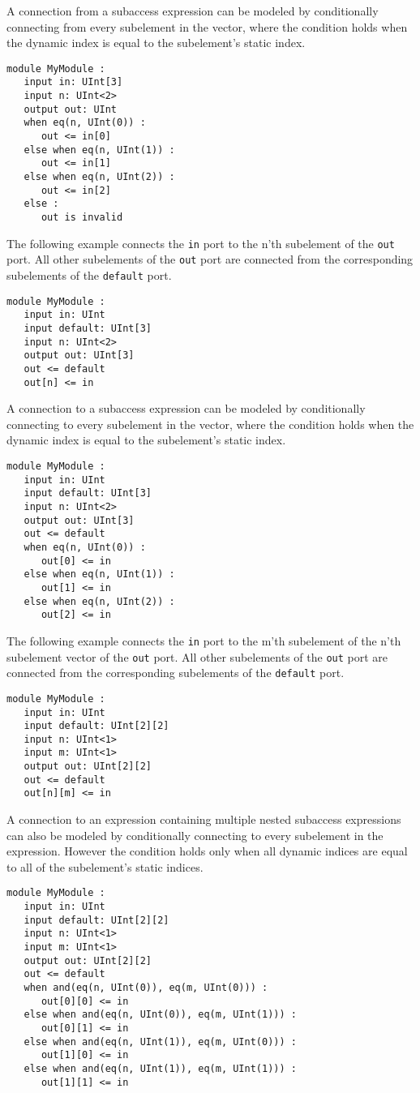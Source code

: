 \documentclass[12pt]{article}
\begin{document}
A connection from a subaccess expression can be modeled by conditionally connecting from every subelement in the vector, where the condition holds when the dynamic index is equal to the subelement's static index.
\begin{verbatim}
module MyModule :
   input in: UInt[3]
   input n: UInt<2>
   output out: UInt
   when eq(n, UInt(0)) :
      out <= in[0]
   else when eq(n, UInt(1)) :
      out <= in[1]
   else when eq(n, UInt(2)) :
      out <= in[2]            
   else :
      out is invalid
\end{verbatim}

The following example connects the \verb|in| port to the n'th subelement of the \verb|out| port. All other subelements of the \verb|out| port are connected from the corresponding subelements of the \verb|default| port.
\begin{verbatim}
module MyModule :
   input in: UInt
   input default: UInt[3]
   input n: UInt<2>
   output out: UInt[3]
   out <= default
   out[n] <= in
\end{verbatim}

A connection to a subaccess expression can be modeled by conditionally connecting to every subelement in the vector, where the condition holds when the dynamic index is equal to the subelement's static index.
\begin{verbatim}
module MyModule :
   input in: UInt
   input default: UInt[3]
   input n: UInt<2>
   output out: UInt[3]   
   out <= default
   when eq(n, UInt(0)) :
      out[0] <= in
   else when eq(n, UInt(1)) :
      out[1] <= in
   else when eq(n, UInt(2)) :
      out[2] <= in
\end{verbatim}

The following example connects the \verb|in| port to the m'th subelement of the n'th subelement vector of the \verb|out| port. All other subelements of the \verb|out| port are connected from the corresponding subelements of the \verb|default| port.
\begin{verbatim}
module MyModule :
   input in: UInt
   input default: UInt[2][2]
   input n: UInt<1>
   input m: UInt<1>
   output out: UInt[2][2]
   out <= default
   out[n][m] <= in
\end{verbatim}

A connection to an expression containing multiple nested subaccess expressions can also be modeled by conditionally connecting to every subelement in the expression. However the condition holds only when all dynamic indices are equal to all of the subelement's static indices.
\begin{verbatim}
module MyModule :
   input in: UInt
   input default: UInt[2][2]
   input n: UInt<1>
   input m: UInt<1>
   output out: UInt[2][2]
   out <= default
   when and(eq(n, UInt(0)), eq(m, UInt(0))) :
      out[0][0] <= in
   else when and(eq(n, UInt(0)), eq(m, UInt(1))) :
      out[0][1] <= in
   else when and(eq(n, UInt(1)), eq(m, UInt(0))) :
      out[1][0] <= in
   else when and(eq(n, UInt(1)), eq(m, UInt(1))) :
      out[1][1] <= in                  
\end{verbatim}
\end{document}
